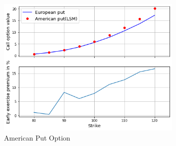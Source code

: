 \begin{figure}[H]
	\begin{center}
		\includegraphics[width=0.8\textwidth]{American_option}
	\end{center}
	\caption{American Put Option}
\end{figure}